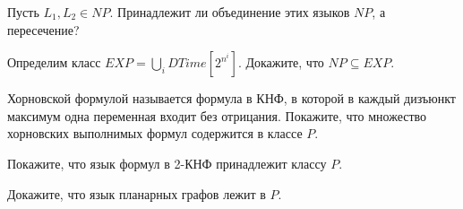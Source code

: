 \setcounter{curtask}{24}


\begin{task}
    Пусть $L_1, L_2 \in NP$. Принадлежит ли объединение этих языков $NP$, а пересечение?
\end{task}

\begin{task}
    Определим класс $EXP = \bigcup\limits_{i}DTime[2^{n^i}]$. Докажите, что
    $NP \subseteq EXP$.
\end{task}

\begin{task}
    Хорновской формулой называется формула в КНФ, в которой в каждый дизъюнкт
    максимум одна переменная входит без отрицания. Покажите, что множество
    хорновских выполнимых формул содержится в классе $P$.
\end{task}

\begin{task}
    Покажите, что язык формул в 2-КНФ принадлежит классу $P$.
\end{task}

\begin{task}
    Докажите, что язык планарных графов лежит в $P$.
\end{task}